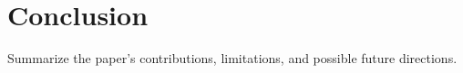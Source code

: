 \section{Conclusion}

Summarize the paper's contributions, limitations, and possible future directions.
